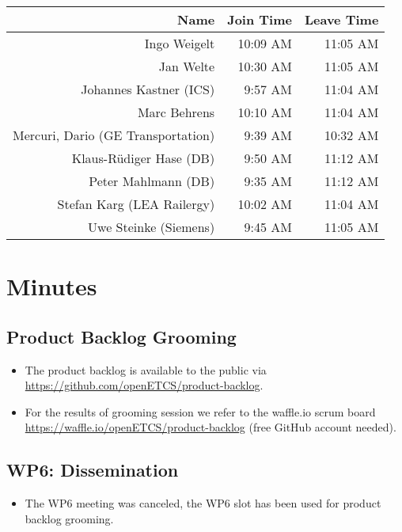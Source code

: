 \documentclass[a4paper, 11pt]{article}
\begin{document}
\begin{table}[htbp]
    \begin{tabular}{rrr}
    \toprule
    \textbf{Name} & \textbf{Join Time} & \textbf{Leave Time} \\
    \midrule
    Ingo Weigelt & 10:09 AM & 11:05 AM \\
    Jan Welte & 10:30 AM & 11:05 AM \\
    Johannes Kastner (ICS) & 9:57 AM & 11:04 AM \\
    Marc Behrens & 10:10 AM & 11:04 AM \\
    Mercuri, Dario (GE Transportation) & 9:39 AM & 10:32 AM \\
    Klaus-R\"udiger Hase (DB) & 9:50 AM & 11:12 AM \\
    Peter Mahlmann (DB) & 9:35 AM & 11:12 AM \\
    Stefan Karg (LEA Railergy) & 10:02 AM & 11:04 AM \\
    Uwe Steinke (Siemens) & 9:45 AM & 11:05 AM \\
    \bottomrule
    \end{tabular}%
  \label{tab:addlabel}%
\end{table}%




\section{Minutes}

\subsection{Product Backlog Grooming}
\begin{itemize}
\item The product backlog is available to the public via 
\url{https://github.com/openETCS/product-backlog}. 
\item For the results of grooming session we refer to the waffle.io scrum board \url{https://waffle.io/openETCS/product-backlog} (free GitHub account needed).
\end{itemize}

\subsection{WP6: Dissemination}
\begin{itemize}
\item The WP6 meeting was canceled, the WP6 slot has been used for product backlog grooming.
\end{itemize}
\end{document}
